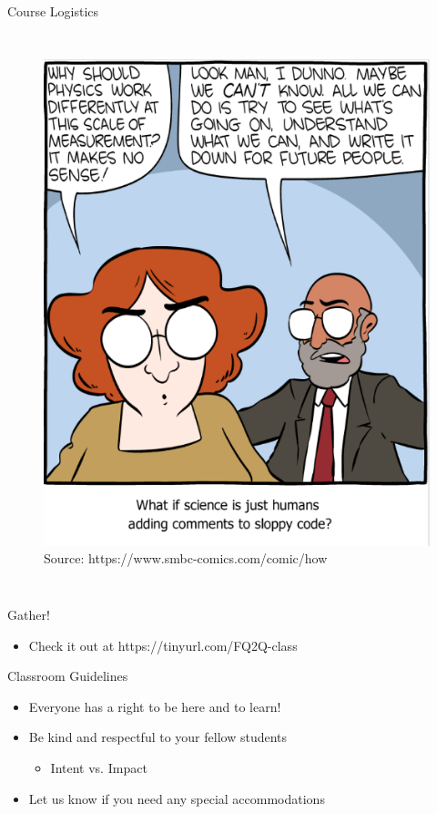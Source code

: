 \documentclass[10pt,xcolor={table,dvipsnames},t]{beamer}
\begin{document}
\begin{frame}{Course Logistics}
\begin{columns}
\begin{figure}
            \includegraphics[scale=0.5]{smbc.png} \\
            \tiny{Source: https://www.smbc-comics.com/comic/how}
        \end{figure}
    \end{columns}
\end{frame}

\begin{frame}{Gather!}
    \begin{itemize}
        \pause \item Check it out at https://tinyurl.com/FQ2Q-class
    \end{itemize}
\end{frame}

\begin{frame}{Classroom Guidelines}
    \begin{itemize}
        \item Everyone has a right to be here and to learn!
        \item Be kind and respectful to your fellow students
        \begin{itemize}
            \item Intent vs. Impact
        \end{itemize}
        \item Let us know if you need any special accommodations
    \end{itemize}
\end{frame}
\end{document}

